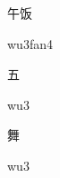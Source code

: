 \begin{verbete}[wu3fan4]{午饭}
\begin{pronuncia}{wu3fan4}
\end{pronuncia}
\end{verbete}

\begin{verbete}[wu3]{五}
\begin{pronuncia}{wu3}
\end{pronuncia}
\end{verbete}

\begin{verbete}[wu3]{舞}
\begin{pronuncia}{wu3}
\end{pronuncia}
\end{verbete}

